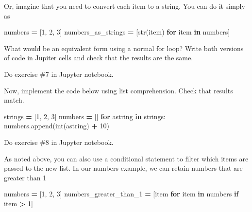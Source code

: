 \documentclass[
]{book}
\newenvironment{Shaded}{\begin{snugshade}}{\end{snugshade}}
\newcommand{\BuiltInTok}[1]{#1}
\newcommand{\ControlFlowTok}[1]{\textcolor[rgb]{0.13,0.29,0.53}{\textbf{#1}}}
\newcommand{\DecValTok}[1]{\textcolor[rgb]{0.00,0.00,0.81}{#1}}
\newcommand{\KeywordTok}[1]{\textcolor[rgb]{0.13,0.29,0.53}{\textbf{#1}}}
\newcommand{\NormalTok}[1]{#1}
\newcommand{\OperatorTok}[1]{\textcolor[rgb]{0.81,0.36,0.00}{\textbf{#1}}}
\newcommand{\StringTok}[1]{\textcolor[rgb]{0.31,0.60,0.02}{#1}}
\begin{document}
Or, imagine that you need to convert each item to a string. You can do it simply as

\begin{Shaded}
\begin{Highlighting}[]
\NormalTok{numbers }\OperatorTok{=}\NormalTok{ [}\DecValTok{1}\NormalTok{, }\DecValTok{2}\NormalTok{, }\DecValTok{3}\NormalTok{]}
\NormalTok{numbers\_as\_strings }\OperatorTok{=}\NormalTok{ [}\BuiltInTok{str}\NormalTok{(item) }\ControlFlowTok{for}\NormalTok{ item }\KeywordTok{in}\NormalTok{ numbers]}
\end{Highlighting}
\end{Shaded}

What would be an equivalent form using a normal for loop? Write both versions of code in Jupiter cells and check that the results are the same.

Do exercise \#7 in Jupyter notebook.

Now, implement the code below using list comprehension. Check that results match.

\begin{Shaded}
\begin{Highlighting}[]
\NormalTok{strings }\OperatorTok{=}\NormalTok{ [}\StringTok{\textquotesingle{}1\textquotesingle{}}\NormalTok{, }\StringTok{\textquotesingle{}2\textquotesingle{}}\NormalTok{, }\StringTok{\textquotesingle{}3\textquotesingle{}}\NormalTok{]}
\NormalTok{numbers }\OperatorTok{=}\NormalTok{ []}
\ControlFlowTok{for}\NormalTok{ astring }\KeywordTok{in}\NormalTok{ strings:}
\NormalTok{    numbers.append(}\BuiltInTok{int}\NormalTok{(astring) }\OperatorTok{+} \DecValTok{10}\NormalTok{)}
\end{Highlighting}
\end{Shaded}

Do exercise \#8 in Jupyter notebook.

As noted above, you can also use a conditional statement to filter which items are passed to the new list. In our numbers example, we can retain numbers that are greater than 1

\begin{Shaded}
\begin{Highlighting}[]
\NormalTok{numbers }\OperatorTok{=}\NormalTok{ [}\DecValTok{1}\NormalTok{, }\DecValTok{2}\NormalTok{, }\DecValTok{3}\NormalTok{]}
\NormalTok{numbers\_greater\_than\_1 }\OperatorTok{=}\NormalTok{ [item }\ControlFlowTok{for}\NormalTok{ item }\KeywordTok{in}\NormalTok{ numbers }\ControlFlowTok{if}\NormalTok{ item }\OperatorTok{\textgreater{}} \DecValTok{1}\NormalTok{]}
\end{Highlighting}
\end{Shaded}
\end{document}
